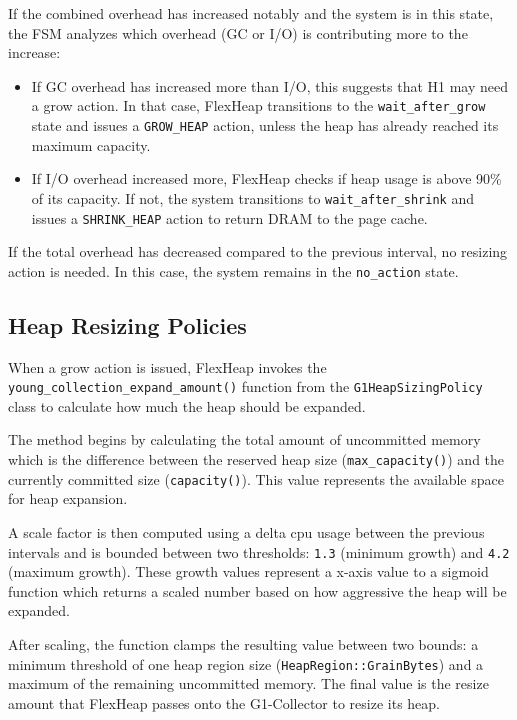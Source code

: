 If the combined overhead has increased notably and the system is in this state, the FSM analyzes which overhead (GC or I/O) is 
contributing more to the increase:
\begin{itemize}
  \item If GC overhead has increased more than I/O, this suggests that H1 may need a grow action. 
  In that case, FlexHeap transitions to the \texttt{wait\_after\_grow} state and issues a \texttt{GROW\_HEAP} action, 
  unless the heap has already reached its maximum capacity.

  \item If I/O overhead increased more, FlexHeap checks if heap usage is above 90\% of 
  its capacity. If not, the system transitions to \texttt{wait\_after\_shrink} and issues a \texttt{SHRINK\_HEAP} 
  action to return DRAM to the page cache.
\end{itemize}

If the total overhead has decreased compared to the previous interval, no resizing action is needed. In this case, 
the system remains in the \texttt{no\_action} state.

\subsection{Heap Resizing Policies}

When a grow action is issued, FlexHeap invokes the \texttt{young\_collection\_expand\_amount()} function from 
the \texttt{G1HeapSizingPolicy} class to calculate how much the heap should be expanded.

The method begins by calculating the total amount of uncommitted memory which is the difference
between the reserved heap size (\texttt{max\_capacity()}) and the currently committed size 
(\texttt{capacity()}). This value represents the available space for heap expansion.

A scale factor is then computed using a delta cpu usage between the previous intervals and is bounded between two thresholds: \texttt{1.3} 
(minimum growth) and \texttt{4.2} (maximum growth). These growth values represent a x-axis value to a sigmoid
function which returns a scaled number based on how aggressive the heap will be expanded.

After scaling, the function clamps the resulting value between two bounds: a minimum threshold of one heap region size 
(\texttt{HeapRegion::GrainBytes}) and a maximum of the remaining uncommitted memory. 
The final value is the resize amount that FlexHeap passes onto the G1-Collector to resize its heap.

